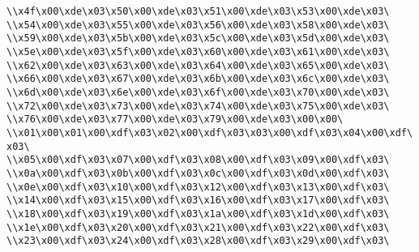 \verb|\\x4f\x00\xde\x03\x50\x00\xde\x03\x51\x00\xde\x03\x53\x00\xde\x03\|\newline
\verb|\\x54\x00\xde\x03\x55\x00\xde\x03\x56\x00\xde\x03\x58\x00\xde\x03\|\newline
\verb|\\x59\x00\xde\x03\x5b\x00\xde\x03\x5c\x00\xde\x03\x5d\x00\xde\x03\|\newline
\verb|\\x5e\x00\xde\x03\x5f\x00\xde\x03\x60\x00\xde\x03\x61\x00\xde\x03\|\newline
\verb|\\x62\x00\xde\x03\x63\x00\xde\x03\x64\x00\xde\x03\x65\x00\xde\x03\|\newline
\verb|\\x66\x00\xde\x03\x67\x00\xde\x03\x6b\x00\xde\x03\x6c\x00\xde\x03\|\newline
\verb|\\x6d\x00\xde\x03\x6e\x00\xde\x03\x6f\x00\xde\x03\x70\x00\xde\x03\|\newline
\verb|\\x72\x00\xde\x03\x73\x00\xde\x03\x74\x00\xde\x03\x75\x00\xde\x03\|\newline
\verb|\\x76\x00\xde\x03\x77\x00\xde\x03\x79\x00\xde\x03\x00\x00\|\newline
\verb|\\x01\x00\x01\x00\xdf\x03\x02\x00\xdf\x03\x03\x00\xdf\x03\x04\x00\xdf\x03\|\newline
\verb|\\x05\x00\xdf\x03\x07\x00\xdf\x03\x08\x00\xdf\x03\x09\x00\xdf\x03\|\newline
\verb|\\x0a\x00\xdf\x03\x0b\x00\xdf\x03\x0c\x00\xdf\x03\x0d\x00\xdf\x03\|\newline
\verb|\\x0e\x00\xdf\x03\x10\x00\xdf\x03\x12\x00\xdf\x03\x13\x00\xdf\x03\|\newline
\verb|\\x14\x00\xdf\x03\x15\x00\xdf\x03\x16\x00\xdf\x03\x17\x00\xdf\x03\|\newline
\verb|\\x18\x00\xdf\x03\x19\x00\xdf\x03\x1a\x00\xdf\x03\x1d\x00\xdf\x03\|\newline
\verb|\\x1e\x00\xdf\x03\x20\x00\xdf\x03\x21\x00\xdf\x03\x22\x00\xdf\x03\|\newline
\verb|\\x23\x00\xdf\x03\x24\x00\xdf\x03\x28\x00\xdf\x03\x29\x00\xdf\x03\|\newline

